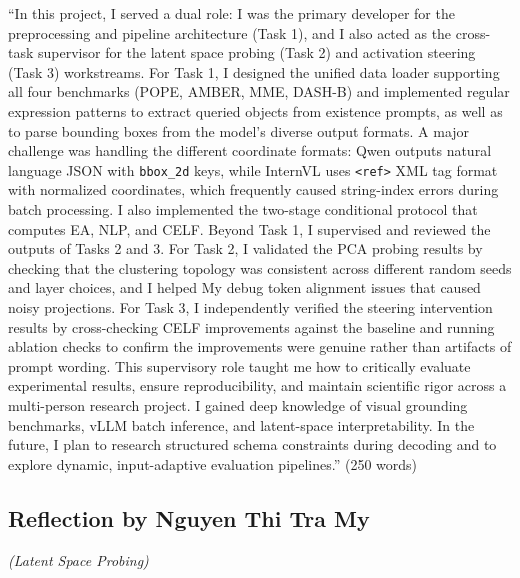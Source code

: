 \documentclass[12pt,a4paper]{article}
\begin{document}
``In this project, I served a dual role: I was the primary developer for the preprocessing and pipeline architecture (Task 1), and I also acted as the cross-task supervisor for the latent space probing (Task 2) and activation steering (Task 3) workstreams. For Task 1, I designed the unified data loader supporting all four benchmarks (POPE, AMBER, MME, DASH-B) and implemented regular expression patterns to extract queried objects from existence prompts, as well as to parse bounding boxes from the model's diverse output formats. A major challenge was handling the different coordinate formats: Qwen outputs natural language JSON with \texttt{bbox\_2d} keys, while InternVL uses \texttt{\textless ref\textgreater} XML tag format with normalized coordinates, which frequently caused string-index errors during batch processing. I also implemented the two-stage conditional protocol that computes EA, NLP, and CELF. Beyond Task 1, I supervised and reviewed the outputs of Tasks 2 and 3. For Task 2, I validated the PCA probing results by checking that the clustering topology was consistent across different random seeds and layer choices, and I helped My debug token alignment issues that caused noisy projections. For Task 3, I independently verified the steering intervention results by cross-checking CELF improvements against the baseline and running ablation checks to confirm the improvements were genuine rather than artifacts of prompt wording. This supervisory role taught me how to critically evaluate experimental results, ensure reproducibility, and maintain scientific rigor across a multi-person research project. I gained deep knowledge of visual grounding benchmarks, vLLM batch inference, and latent-space interpretability. In the future, I plan to research structured schema constraints during decoding and to explore dynamic, input-adaptive evaluation pipelines.'' (250 words)

\subsection{Reflection by Nguyen Thi Tra My}
\textit{(Latent Space Probing)}
\end{document}
